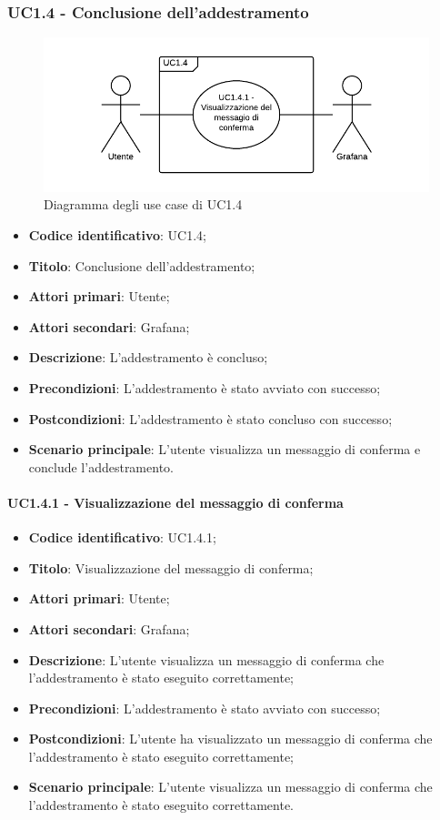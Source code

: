 \subsubsection{UC1.4 - Conclusione dell'addestramento}
\begin{figure}[H]
\includegraphics{img/UC1.4.png}
\caption{Diagramma degli use case di UC1.4}
\end{figure}
\begin{itemize}
	\item \textbf{Codice identificativo}: UC1.4;
	\item \textbf{Titolo}: Conclusione dell'addestramento;
	\item \textbf{Attori primari}: Utente;
	\item \textbf{Attori secondari}: Grafana\glo;
	\item \textbf{Descrizione}: L'addestramento è concluso;
	\item \textbf{Precondizioni}: L'addestramento è stato avviato con successo;
	\item \textbf{Postcondizioni}: L'addestramento è stato concluso con successo;
	\item \textbf{Scenario principale}: L'utente visualizza un messaggio di conferma e conclude l'addestramento.
\end{itemize}

\paragraph{UC1.4.1 - Visualizzazione del messaggio di conferma}
\begin{itemize}
	\item \textbf{Codice identificativo}: UC1.4.1;
	\item \textbf{Titolo}: Visualizzazione del messaggio di conferma;
	\item \textbf{Attori primari}: Utente;
	\item \textbf{Attori secondari}: Grafana\glo;
	\item \textbf{Descrizione}: L'utente visualizza un messaggio di conferma che l'addestramento è stato eseguito correttamente;
	\item \textbf{Precondizioni}: L'addestramento è stato avviato con successo;
	\item \textbf{Postcondizioni}: L'utente ha visualizzato un messaggio di conferma che l'addestramento è stato eseguito correttamente;
	\item \textbf{Scenario principale}: L'utente visualizza un messaggio di conferma che l'addestramento è stato eseguito correttamente.
\end{itemize}
